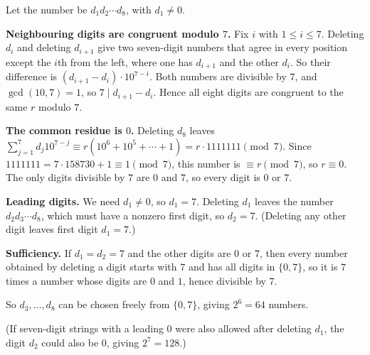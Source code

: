 Let the number be $d_1d_2\cdots d_8$, with $d_1\ne0$.

\textbf{Neighbouring digits are congruent modulo $7$.} Fix $i$ with $1\le i\le7$. Deleting $d_i$ and deleting $d_{i+1}$ give two seven-digit numbers that agree in every position except the $i$th from the left, where one has $d_{i+1}$ and the other $d_i$. So their difference is $(d_{i+1}-d_i)\cdot10^{7-i}$. Both numbers are divisible by $7$, and $\gcd(10,7)=1$, so $7\mid d_{i+1}-d_i$. Hence all eight digits are congruent to the same $r$ modulo $7$.

\textbf{The common residue is $0$.} Deleting $d_8$ leaves $\sum_{j=1}^{7}d_j10^{7-j}\equiv r\left(10^6+10^5+\cdots+1\right)=r\cdot1111111\pmod7$. Since $1111111=7\cdot158730+1\equiv1\pmod7$, this number is $\equiv r\pmod7$, so $r\equiv0$. The only digits divisible by $7$ are $0$ and $7$, so every digit is $0$ or $7$.

\textbf{Leading digits.} We need $d_1\ne0$, so $d_1=7$. Deleting $d_1$ leaves the number $d_2d_3\cdots d_8$, which must have a nonzero first digit, so $d_2=7$. (Deleting any other digit leaves first digit $d_1=7$.)

\textbf{Sufficiency.} If $d_1=d_2=7$ and the other digits are $0$ or $7$, then every number obtained by deleting a digit starts with $7$ and has all digits in $\{0,7\}$, so it is $7$ times a number whose digits are $0$ and $1$, hence divisible by $7$.

So $d_3,\dots,d_8$ can be chosen freely from $\{0,7\}$, giving $2^6=\boxed{64}$ numbers.

(If seven-digit strings with a leading $0$ were also allowed after deleting $d_1$, the digit $d_2$ could also be $0$, giving $2^7=128$.)
